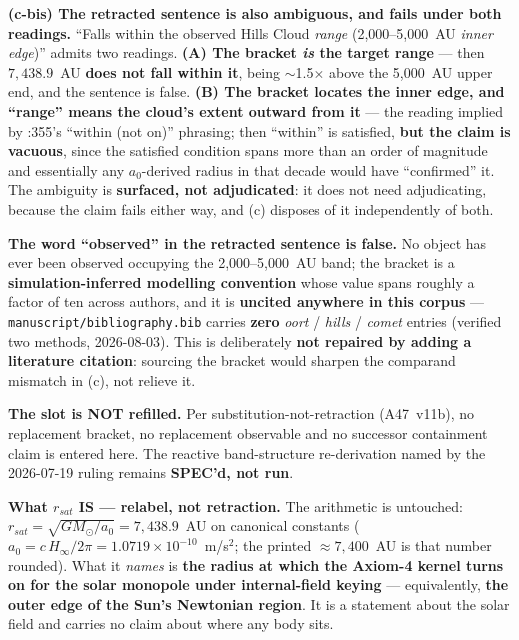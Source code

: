\noindent\textbf{(c-bis) The retracted sentence is also ambiguous, and fails
under both readings.}  ``Falls within the observed Hills Cloud \emph{range}
(2,000--5,000~AU \emph{inner edge})'' admits two readings.  \textbf{(A) The
bracket \emph{is} the target range} --- then $7{,}438.9$~AU \textbf{does not
fall within it}, being $\sim$1.5$\times$ above the 5,000~AU upper end, and the
sentence is false.  \textbf{(B) The bracket locates the inner edge, and
``range'' means the cloud's extent outward from it} --- the reading implied by
:355's ``within (not on)'' phrasing; then
``within'' is satisfied, \textbf{but the claim is vacuous}, since the satisfied
condition spans more than an order of magnitude and essentially any
$a_0$-derived radius in that decade would have ``confirmed'' it.  The ambiguity
is \textbf{surfaced, not adjudicated}: it does not need adjudicating, because
the claim fails either way, and (c) disposes of it independently of both.

\noindent\textbf{The word ``observed'' in the retracted sentence is false.}  No
object has ever been observed occupying the 2,000--5,000~AU band; the bracket
is a \textbf{simulation-inferred modelling convention} whose value spans
roughly a factor of ten across authors, and it is \textbf{uncited anywhere in
this corpus} --- \texttt{manuscript/bibliography.bib} carries \textbf{zero}
\emph{oort} / \emph{hills} / \emph{comet} entries (verified two methods,
2026-08-03).  This is deliberately \textbf{not repaired by adding a literature
citation}: sourcing the bracket would sharpen the comparand mismatch in (c),
not relieve it.

\noindent\textbf{The slot is NOT refilled.}  Per substitution-not-retraction
(A47~v11b), no replacement bracket, no replacement observable and no successor
containment claim is entered here.  The reactive band-structure re-derivation
named by the 2026-07-19 ruling remains \textbf{SPEC'd, not run}.

\noindent\textbf{What $r_{sat}$ IS --- relabel, not retraction.}  The
arithmetic is untouched: $r_{sat} = \sqrt{GM_\odot/a_0} = 7{,}438.9$~AU on
canonical constants ($a_0 = c\,H_\infty/2\pi = 1.0719\times10^{-10}$~m/s$^2$;
the printed $\approx 7{,}400$~AU is that number rounded).  What it \emph{names}
is \textbf{the radius at which the Axiom-4 kernel turns on for the solar
monopole under internal-field keying} --- equivalently, \textbf{the outer edge
of the Sun's Newtonian region}.  It is a statement about the solar field and
carries no claim about where any body sits.

